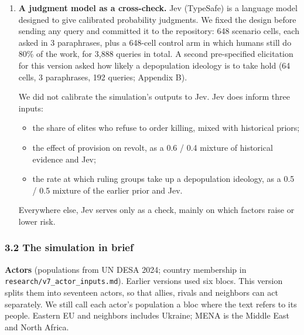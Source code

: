 \documentclass[
  10pt,
]{article}
\providecommand{\tightlist}{%
  \setlength{\itemsep}{0pt}\setlength{\parskip}{0pt}}
\begin{document}
\begin{enumerate}
  Grievance, insurgency, democratic erosion, purges, alliances, war and cross-border campaigns arise
  inside the model rather than being imposed.
\item
  \textbf{A judgment model as a cross-check.} Jev (TypeSafe) is a language model designed to give
  calibrated probability judgments. We fixed the design before sending any query and committed it to
  the repository: 648 scenario cells, each asked in 3 paraphrases, plus a 648-cell control arm in
  which humans still do 80\% of the work, for 3,888 queries in total. A second pre-specified
  elicitation for this version asked how likely a depopulation ideology is to take hold (64 cells, 3
  paraphrases, 192 queries; Appendix B).

  We did not calibrate the simulation's outputs to Jev. Jev does inform three inputs:

  \begin{itemize}
  \tightlist
  \item
    the share of elites who refuse to order killing, mixed with historical priors;
  \item
    the effect of provision on revolt, as a 0.6 / 0.4 mixture of historical evidence and Jev;
  \item
    the rate at which ruling groups take up a depopulation ideology, as a 0.5 / 0.5 mixture of the
    earlier prior and Jev.
  \end{itemize}

  Everywhere else, Jev serves only as a check, mainly on which factors raise or lower risk.
\end{enumerate}

\subsubsection{3.2 The simulation in brief}\label{the-simulation-in-brief}

\textbf{Actors} (populations from UN DESA 2024; country membership in
\texttt{research/v7\_actor\_inputs.md}). Earlier versions used six blocs. This version splits them
into seventeen actors, so that allies, rivals and neighbors can act separately. We still call each
actor's population a bloc where the text refers to its people. Eastern EU and neighbors includes
Ukraine; MENA is the Middle East and North Africa.
\end{document}
